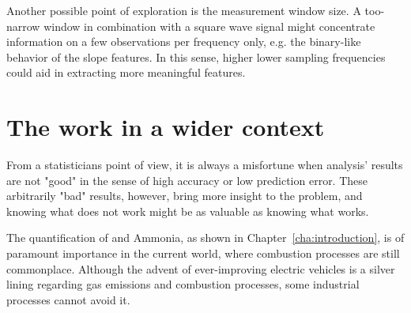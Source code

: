 Another possible point of exploration is the measurement window size. A too-narrow window in combination with a square wave signal might concentrate information on a few observations per frequency only, e.g. the binary-like behavior of the slope features. In this sense, higher lower sampling frequencies could aid in extracting more meaningful features.

\section{The work in a wider context}
\label{sec:work-wider-context}

From a statisticians point of view, it is always a misfortune when analysis' results are not "good" in the sense of high accuracy or low prediction error. These arbitrarily "bad" results, however, bring more insight to the problem, and knowing what does not work might be as valuable as knowing what works.

The quantification of \nox and Ammonia, as shown in Chapter~\ref{cha:introduction}, is of paramount importance in the current world, where combustion processes are still commonplace. Although the advent of ever-improving electric vehicles is a silver lining regarding gas emissions and combustion processes, some industrial processes cannot avoid it. 


